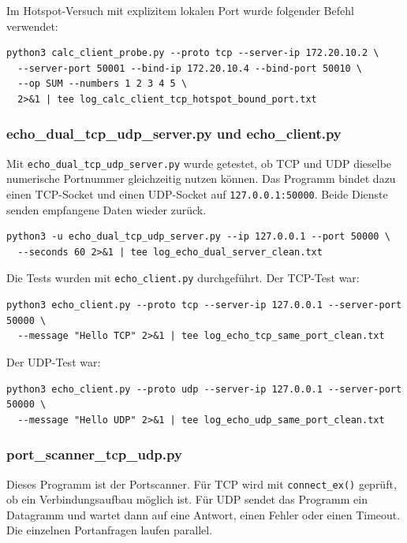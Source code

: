 \documentclass{kdiartcl}
\begin{document}
Im Hotspot-Versuch mit explizitem lokalen Port wurde folgender Befehl verwendet:

\begin{verbatim}
python3 calc_client_probe.py --proto tcp --server-ip 172.20.10.2 \
  --server-port 50001 --bind-ip 172.20.10.4 --bind-port 50010 \
  --op SUM --numbers 1 2 3 4 5 \
  2>&1 | tee log_calc_client_tcp_hotspot_bound_port.txt
\end{verbatim}

\subsubsection*{echo\_dual\_tcp\_udp\_server.py und echo\_client.py}

Mit \texttt{echo\_dual\_tcp\_udp\_server.py} wurde getestet, ob TCP und UDP dieselbe numerische Portnummer gleichzeitig nutzen können. Das Programm bindet dazu einen TCP-Socket und einen UDP-Socket auf \texttt{127.0.0.1:50000}. Beide Dienste senden empfangene Daten wieder zurück.

\begin{verbatim}
python3 -u echo_dual_tcp_udp_server.py --ip 127.0.0.1 --port 50000 \
  --seconds 60 2>&1 | tee log_echo_dual_server_clean.txt
\end{verbatim}

Die Tests wurden mit \texttt{echo\_client.py} durchgeführt. Der TCP-Test war:

\begin{verbatim}
python3 echo_client.py --proto tcp --server-ip 127.0.0.1 --server-port 50000 \
  --message "Hello TCP" 2>&1 | tee log_echo_tcp_same_port_clean.txt
\end{verbatim}

Der UDP-Test war:

\begin{verbatim}
python3 echo_client.py --proto udp --server-ip 127.0.0.1 --server-port 50000 \
  --message "Hello UDP" 2>&1 | tee log_echo_udp_same_port_clean.txt
\end{verbatim}

\subsubsection*{port\_scanner\_tcp\_udp.py}

Dieses Programm ist der Portscanner. Für TCP wird mit \texttt{connect\_ex()} geprüft, ob ein Verbindungsaufbau möglich ist. Für UDP sendet das Programm ein Datagramm und wartet dann auf eine Antwort, einen Fehler oder einen Timeout. Die einzelnen Portanfragen laufen parallel.
\end{document}
